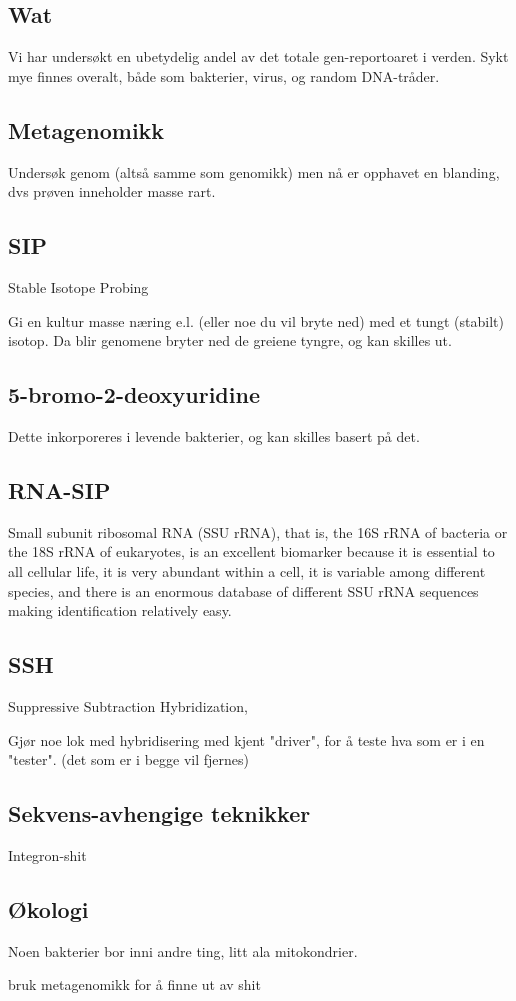 \subsection{Wat}
    Vi har undersøkt en ubetydelig andel av det totale gen-reportoaret i verden. 
    Sykt mye finnes overalt, både som bakterier, virus, og random DNA-tråder. 

\subsection{Metagenomikk}
    Undersøk genom (altså samme som genomikk) men nå er opphavet en blanding, dvs prøven inneholder masse rart.

\subsection{SIP}
    Stable Isotope Probing

    Gi en kultur masse næring e.l. (eller noe du vil bryte ned) med et tungt (stabilt) isotop. 
    Da blir genomene bryter ned de greiene tyngre, og kan skilles ut.

\subsection{5-bromo-2-deoxyuridine}
    Dette inkorporeres i levende bakterier, og kan skilles basert på det.

\subsection{RNA-SIP}
    Small subunit ribosomal RNA (SSU rRNA), that is, the 16S rRNA of bacteria or the 18S rRNA of eukaryotes, 
    is an excellent biomarker because it is essential to all cellular life, it is very abundant within a cell, 
    it is variable among different species, and there is an enormous database of different SSU rRNA sequences making identification relatively easy.

\subsection{SSH}
    Suppressive Subtraction Hybridization,

    Gjør noe lok med hybridisering med kjent "driver", for å teste hva som er i en "tester". (det som er i begge vil fjernes)

\subsection{Sekvens-avhengige teknikker}
    Integron-shit

\subsection{Økologi}
    Noen bakterier bor inni andre ting, litt ala mitokondrier.
    
    bruk metagenomikk for å finne ut av shit
